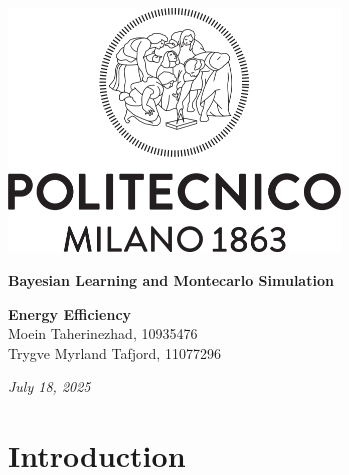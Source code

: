 \documentclass[a4paper,12pt]{article}
\begin{document}
\thispagestyle{empty}
    

\begin{center}
    \includegraphics[width=0.66\textwidth]{Logo_Politecnico_Milano.png}
\end{center}

\vspace{2cm}
\begin{center}
    {\Huge \textbf{Bayesian Learning and Montecarlo Simulation}}\\
\end{center}

\vspace{1cm}
\begin{center}
    {\Huge \textbf{Energy Efficiency}}\\[1em]
    Moein Taherinezhad, 10935476\\
    Trygve Myrland Tafjord, 11077296
\end{center}

\vfill
\begin{center}
    \textit{July 18, 2025}
\end{center}

\newpage  %

\tableofcontents
\section{Introduction}
\end{document}
